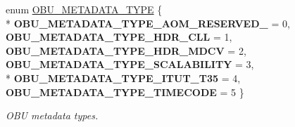 \begin{DoxyCompactItemize}
\item 
enum \hyperlink{group__codec_gaaeb1643131595e752f0c823cbca1c8cb}{O\+B\+U\+\_\+\+M\+E\+T\+A\+D\+A\+T\+A\+\_\+\+T\+Y\+PE} \{ \\*
{\bfseries O\+B\+U\+\_\+\+M\+E\+T\+A\+D\+A\+T\+A\+\_\+\+T\+Y\+P\+E\+\_\+\+A\+O\+M\+\_\+\+R\+E\+S\+E\+R\+V\+E\+D\+\_} = 0, 
{\bfseries O\+B\+U\+\_\+\+M\+E\+T\+A\+D\+A\+T\+A\+\_\+\+T\+Y\+P\+E\+\_\+\+H\+D\+R\+\_\+\+C\+LL} = 1, 
{\bfseries O\+B\+U\+\_\+\+M\+E\+T\+A\+D\+A\+T\+A\+\_\+\+T\+Y\+P\+E\+\_\+\+H\+D\+R\+\_\+\+M\+D\+CV} = 2, 
{\bfseries O\+B\+U\+\_\+\+M\+E\+T\+A\+D\+A\+T\+A\+\_\+\+T\+Y\+P\+E\+\_\+\+S\+C\+A\+L\+A\+B\+I\+L\+I\+TY} = 3, 
\\*
{\bfseries O\+B\+U\+\_\+\+M\+E\+T\+A\+D\+A\+T\+A\+\_\+\+T\+Y\+P\+E\+\_\+\+I\+T\+U\+T\+\_\+\+T35} = 4, 
{\bfseries O\+B\+U\+\_\+\+M\+E\+T\+A\+D\+A\+T\+A\+\_\+\+T\+Y\+P\+E\+\_\+\+T\+I\+M\+E\+C\+O\+DE} = 5
 \}\hypertarget{group__codec_gaaeb1643131595e752f0c823cbca1c8cb}{}\label{group__codec_gaaeb1643131595e752f0c823cbca1c8cb}
\begin{DoxyCompactList}\small\item\em O\+BU metadata types. \end{DoxyCompactList}
\end{DoxyCompactItemize}
